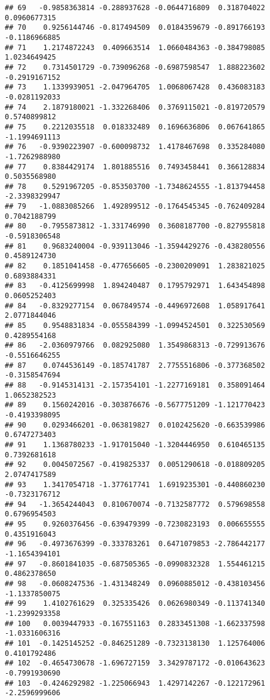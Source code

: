 \documentclass[
]{article}
\begin{document}
\begin{verbatim}
## 69   -0.9858363814 -0.288937628 -0.0644716809  0.318704022  0.0960677315
## 70    0.9256144746 -0.817494509  0.0184359679 -0.891766193 -0.1186966885
## 71    1.2174872243  0.409663514  1.0660484363 -0.384798085  1.0234649425
## 72    0.7314501729 -0.739096268 -0.6987598547  1.888223602 -0.2919167152
## 73    1.1339939051 -2.047964705  1.0068067428  0.436083183 -0.0281192033
## 74    2.1879180021 -1.332268406  0.3769115021 -0.819720579  0.5740899812
## 75    0.2212035518  0.018332489  0.1696636806  0.067641865 -1.1994691113
## 76   -0.9390223907 -0.600098732  1.4178467698  0.335284080 -1.7262988980
## 77    0.8384429174  1.801885516  0.7493458441  0.366128834  0.5035568980
## 78    0.5291967205 -0.853503700 -1.7348624555 -1.813794458 -2.3398329947
## 79   -1.0883085266  1.492899512 -0.1764545345 -0.762409284  0.7042188799
## 80   -0.7955873812 -1.331746990  0.3608187700 -0.827955818 -0.5918306548
## 81    0.9683240004 -0.939113046 -1.3594429276 -0.438280556  0.4589124730
## 82    0.1851041458 -0.477656605 -0.2300209091  1.283821025  0.6893884331
## 83   -0.4125699998  1.894240487  0.1795792971  1.643454898  0.0605252403
## 84   -0.8329277154  0.067849574 -0.4496972608  1.058917641  2.0771844046
## 85    0.9548831834 -0.055584399 -1.0994524501  0.322530569  0.4289554168
## 86   -2.0360979766  0.082925080  1.3549868313 -0.729913676 -0.5516646255
## 87    0.0744536149 -0.185741787  2.7755516806 -0.377368502 -0.3158547694
## 88   -0.9145314131 -2.157354101 -1.2277169181  0.358091464  1.0652382523
## 89    0.1560242016 -0.303876676 -0.5677751209 -1.121770423 -0.4193398095
## 90    0.0293466201 -0.063819827  0.0102425620 -0.663539986  0.6747273403
## 91    1.1368780233 -1.917015040 -1.3204446950  0.610465135  0.7392681618
## 92    0.0045072567 -0.419825337  0.0051290618 -0.018809205  2.0747417589
## 93    1.3417054718 -1.377617741  1.6919235301 -0.440860230 -0.7323176712
## 94   -1.3654244043  0.810670074 -0.7132587772  0.579698558  0.6796954503
## 95    0.9260376456 -0.639479399 -0.7230823193  0.006655555  0.4351916043
## 96   -0.4973676399 -0.333783261  0.6471079853 -2.786442177 -1.1654394101
## 97   -0.8601841035 -0.687505365 -0.0990832328  1.554461215  0.4862378650
## 98   -0.0608247536 -1.431348249  0.0960885012 -0.438103456 -1.1337850075
## 99    1.4102761629  0.325335426  0.0626980349 -0.113741340 -1.2399293358
## 100   0.0039447933 -0.167551163  0.2833451308 -1.662337598 -1.0331606316
## 101  -0.1425145252 -0.846251289 -0.7323138130  1.125764006  0.4101792486
## 102  -0.4654730678 -1.696727159  3.3429787172 -0.010643623 -0.7991930690
## 103  -0.4246292982 -1.225066943  1.4297142267 -0.122172961 -2.2596999606

\end{verbatim}
\end{document}
